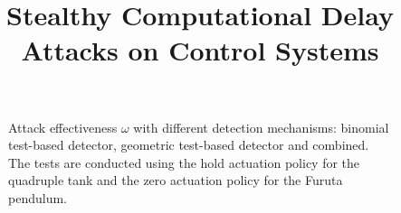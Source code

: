 \documentclass{article}
\title{Stealthy Computational Delay Attacks on Control Systems}
\newcommand{\aeffect}{\omega}
\begin{document}
\maketitle

\begin{figure}
    \centering
    
    \vspace{-1cm}
    \caption{Attack effectiveness $\aeffect$ with different detection mechanisms: binomial test-based detector, geometric test-based detector and combined. The tests are conducted using the hold actuation policy for the quadruple tank and the zero actuation policy for the Furuta pendulum.}
    \label{fig:effect_test}
\end{figure}
\end{document}
